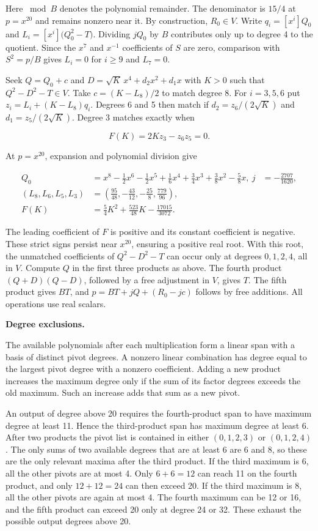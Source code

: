 \documentclass[11pt,a4paper]{article}
\begin{document}
Here \(\bmod B\) denotes the polynomial remainder. The denominator is
\(15/4\) at \(p=x^{20}\) and remains nonzero near it. By construction,
\(R_0\in V\). Write \(q_i=[x^i]Q_0\) and
\(L_i=[x^i]\bigl(Q_0^2-T\bigr)\). Dividing \(jQ_0\) by \(B\) contributes
only up to degree 4 to the quotient. Since the \(x^7\) and \(x^{-1}\)
coefficients of \(S\) are zero, comparison with \(S^2=p/B\) gives
\(L_i=0\) for \(i\ge9\) and \(L_7=0\).

Seek \(Q=Q_0+c\) and \(D=\sqrt K\,x^4+d_2x^2+d_1x\) with \(K>0\) such
that \(Q^2-D^2-T\in V\). Take \(c=(K-L_8)/2\) to match degree 8. For
\(i=3,5,6\) put \(z_i=L_i+(K-L_8)q_i\). Degrees 6 and 5 then match if
\(d_2=z_6/(2\sqrt K)\) and \(d_1=z_5/(2\sqrt K)\). Degree 3 matches
exactly when

\[F(K)=2Kz_3-z_6z_5=0.\]

At \(p=x^{20}\), expansion and polynomial division give

\[\begin{aligned}
Q_0&=x^8-\tfrac12 x^6-\tfrac12 x^5+\tfrac16 x^4+\tfrac34 x^3
       +\tfrac38 x^2-\tfrac58 x,\
j&=-\tfrac{2707}{1620},\\
(L_8,L_6,L_5,L_3)&=(\tfrac{95}{48},-\tfrac{43}{12},-\tfrac{25}{8},\tfrac{779}{96}),\\
F(K)&=\tfrac54 K^2+\tfrac{523}{48}K-\tfrac{17015}{3072}.
\end{aligned}\]

The leading coefficient of \(F\) is positive and its constant
coefficient is negative. These strict signs persist near \(x^{20}\),
ensuring a positive real root. With this root, the unmatched
coefficients of \(Q^2-D^2-T\) can occur only at degrees \(0,1,2,4\), all
in \(V\). Compute \(Q\) in the first three products as above. The fourth
product \((Q+D)(Q-D)\), followed by a free adjustment in \(V\), gives
\(T\). The fifth product gives \(BT\), and \(p=BT+jQ+(R_0-jc)\) follows
by free additions. All operations use real scalars.

\textbf{Degree exclusions.}

The available polynomials after each multiplication form a linear span
with a basis of distinct pivot degrees. A nonzero linear combination has
degree equal to the largest pivot degree with a nonzero coefficient.
Adding a new product increases the maximum degree only if the sum of its
factor degrees exceeds the old maximum. Such an increase adds that sum
as a new pivot.

An output of degree above 20 requires the fourth-product span to have
maximum degree at least 11. Hence the third-product span has maximum
degree at least 6. After two products the pivot list is contained in
either \((0,1,2,3)\) or \((0,1,2,4)\). The only sums of two available
degrees that are at least 6 are 6 and 8, so these are the only relevant
maxima after the third product. If the third maximum is 6, all the other
pivots are at most 4. Only \(6+6=12\) can reach 11 on the fourth
product, and only \(12+12=24\) can then exceed 20. If the third maximum
is 8, all the other pivots are again at most 4. The fourth maximum can
be 12 or 16, and the fifth product can exceed 20 only at degree 24 or
32. These exhaust the possible output degrees above 20.
\end{document}
